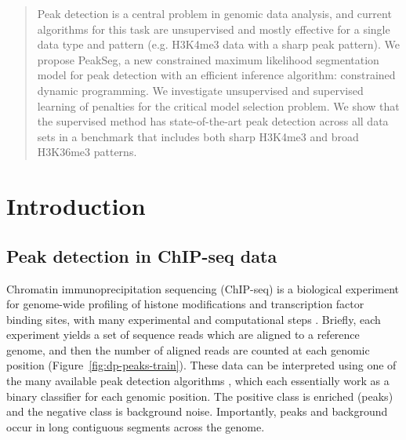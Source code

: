 \documentclass{article}
\begin{document}

\begin{abstract}
  Peak detection is a central problem in genomic data analysis, and
  current algorithms for this task are unsupervised and mostly
  effective for a single data type and pattern (e.g. H3K4me3 data with
  a sharp peak pattern). We propose PeakSeg, a new constrained maximum
  likelihood segmentation model for peak detection with an efficient
  inference algorithm: constrained dynamic programming. We investigate
  un\-super\-vised and super\-vised learning of penalties for
  the critical model selection problem. We show that the 
  super\-vised method has state-of-the-art peak
  detection across all data sets in a benchmark that includes both
  sharp H3K4me3 and broad H3K36me3 patterns.
\end{abstract}

\section{Introduction}

\subsection{Peak detection in ChIP-seq data}

Chromatin immunoprecipitation sequencing (ChIP-seq) is a biological
experiment for genome-wide profiling of histone modifications and
transcription factor binding sites, with many experimental and
computational steps \citep{practical}. Briefly, each experiment yields
a set of sequence reads which are aligned to a reference genome, and
then the number of aligned reads are counted at each genomic position
(Figure~\ref{fig:dp-peaks-train}). These data can be interpreted using
one of the many available peak detection algorithms
\citep{evaluation2010, rye2010manually, chip-seq-bench}, which each
essentially work as a binary classifier for each genomic position. The
positive class is enriched (peaks) and the negative class is
background noise. Importantly, peaks and background occur in long
contiguous segments across the genome.
\end{document}
